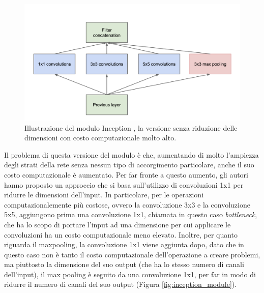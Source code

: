 \begin{figure}[h!]
  \hspace*{0.5in}
  \includegraphics[scale=0.49]{img/inception-module_naive.png}
  \caption{Illustrazione del modulo Inception \cite{inception}, la versione senza riduzione delle dimensioni con costo computazionale molto alto.}
  \label{fig:inception_module_naive}
\end{figure}

Il problema di questa versione del modulo è che, aumentando di molto l'ampiezza degli strati della rete senza nessun tipo di accorgimento particolare,  anche il suo costo computazionale è aumentato. Per far fronte a questo aumento, gli autori hanno proposto un approccio che si basa sull'utilizzo di convoluzioni 1x1 per ridurre le dimensioni dell'input. In particolare, per le operazioni computazionalemente più costose, ovvero la convoluzione 3x3 e la convoluzione 5x5, aggiungono prima  una convoluzione 1x1, chiamata in questo caso \textit{bottleneck}, che ha lo scopo di portare l'input ad una dimensione per cui  applicare le convoluzioni ha un costo computazionale meno elevato. Inoltre, per quanto riguarda il maxpooling, la convoluzione 1x1 viene aggiunta dopo, dato che in questo caso non è tanto il costo computazionale dell'operazione a creare problemi, ma piuttosto la dimensione del suo output (che ha lo stesso numero di canali dell'input), il max pooling è seguito da una convoluzione 1x1, per far in modo di ridurre il numero di canali del suo output (Figura \ref{fig:inception_module}).

